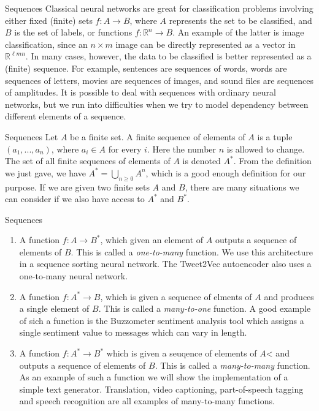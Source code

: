 \documentclass[10pt]{beamer}
\newcommand{\R}{\mathbb{R}}
\begin{document}
\begin{frame}{Sequences}
Classical neural networks are great for classification problems involving either fixed (finite) sets $f:A\to B$, where $A$ represents the set to be classified, and $B$ is the set of labels, or functions $f:\R^n\to B$. An example of the latter is image classification, since an $n\times m$ image can be directly represented as a vector in $\R^{\ell mn}$. In many cases, however, the data to be classified is better represented as a (finite) sequence.  For example, sentences are sequences of words, words are sequences of letters, movies are sequences of images, and sound files are sequences of amplitudes.  It is possible to deal with sequences with ordinary neural networks, but we run into difficulties when we try to model dependency between different elements of a sequence.
\end{frame}

\begin{frame}{Sequences}
Let $A$ be a finite set. A finite sequence of elements of $A$ is a tuple $(a_1,...,a_n)$, where $a_i\in A$ for every $i$.  Here the number $n$ is allowed to change.  The set of all finite sequences of elements of $A$ is denoted $A^*$.  From the definition we just gave, we have $A^*=\bigcup_{n\geq 0} A^n$, which is a good enough definition for our purpose.  If we are given two finite sets $A$ and $B$, there are many situations we can consider if we also have access to $A^*$ and $B^*$.
\end{frame}

\begin{frame}{Sequences}
  \begin{enumerate}
    \item A function $f:A\to B^*$, which given an element of $A$ outputs a sequence of elements of $B$.  This is called a {\em one-to-many} function. We use this architecture in a sequence sorting neural network. The Tweet2Vec autoencoder also uses a one-to-many neural network.
    \item A function $f:A^*\to B$, which is given a sequence of elments of $A$ and produces a single element of $B$.  This is called a {\em many-to-one} function.  A good example of sich a function is the Buzzometer sentiment analysis tool which assigns a single sentiment value to messages which can vary in length.
    \item A function $f:A^*\to B^*$ which is given a seuqence of elements of $A$< and outputs a sequence of elements of $B$.  This is called a {\em many-to-many} function.  As an example of such a function we will show the implementation of a simple text generator.  Translation, video captioning, part-of-speech tagging and speech recognition are all examples of many-to-many functions.
  \end{enumerate}
\end{frame}
\end{document}
